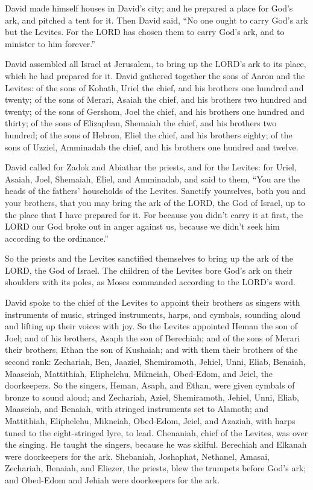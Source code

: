  David made himself houses in David's city; and he prepared
a place for God's ark, and pitched a tent for it.  Then
David said, ``No one ought to carry God's ark but the Levites. For the
LORD has chosen them to carry God's ark, and to minister to him
forever.''

 David assembled all Israel at Jerusalem, to bring up the
LORD's ark to its place, which he had prepared for it. 
David gathered together the sons of Aaron and the Levites: 
of the sons of Kohath, Uriel the chief, and his brothers one hundred and
twenty;  of the sons of Merari, Asaiah the chief, and his
brothers two hundred and twenty;  of the sons of Gershom,
Joel the chief, and his brothers one hundred and thirty;  of
the sons of Elizaphan, Shemaiah the chief, and his brothers two hundred;
 of the sons of Hebron, Eliel the chief, and his brothers
eighty;  of the sons of Uzziel, Amminadab the chief, and
his brothers one hundred and twelve.

 David called for Zadok and Abiathar the priests, and for
the Levites: for Uriel, Asaiah, Joel, Shemaiah, Eliel, and Amminadab,
 and said to them, ``You are the heads of the fathers'
households of the Levites. Sanctify yourselves, both you and your
brothers, that you may bring the ark of the LORD, the God of Israel, up
to the place that I have prepared for it.  For because you
didn't carry it at first, the LORD our God broke out in anger against
us, because we didn't seek him according to the ordinance.''

 So the priests and the Levites sanctified themselves to
bring up the ark of the LORD, the God of Israel.  The
children of the Levites bore God's ark on their shoulders with its
poles, as Moses commanded according to the LORD's word.

 David spoke to the chief of the Levites to appoint their
brothers as singers with instruments of music, stringed instruments,
harps, and cymbals, sounding aloud and lifting up their voices with joy.
 So the Levites appointed Heman the son of Joel; and of his
brothers, Asaph the son of Berechiah; and of the sons of Merari their
brothers, Ethan the son of Kushaiah;  and with them their
brothers of the second rank: Zechariah, Ben, Jaaziel, Shemiramoth,
Jehiel, Unni, Eliab, Benaiah, Maaseiah, Mattithiah, Eliphelehu,
Mikneiah, Obed-Edom, and Jeiel, the doorkeepers.  So the
singers, Heman, Asaph, and Ethan, were given cymbals of bronze to sound
aloud;  and Zechariah, Aziel, Shemiramoth, Jehiel, Unni,
Eliab, Maaseiah, and Benaiah, with stringed instruments set to Alamoth;
 and Mattithiah, Eliphelehu, Mikneiah, Obed-Edom, Jeiel,
and Azaziah, with harps tuned to the eight-stringed lyre, to lead.
 Chenaniah, chief of the Levites, was over the singing. He
taught the singers, because he was skilful.  Berechiah and
Elkanah were doorkeepers for the ark.  Shebaniah,
Joshaphat, Nethanel, Amasai, Zechariah, Benaiah, and Eliezer, the
priests, blew the trumpets before God's ark; and Obed-Edom and Jehiah
were doorkeepers for the ark.

